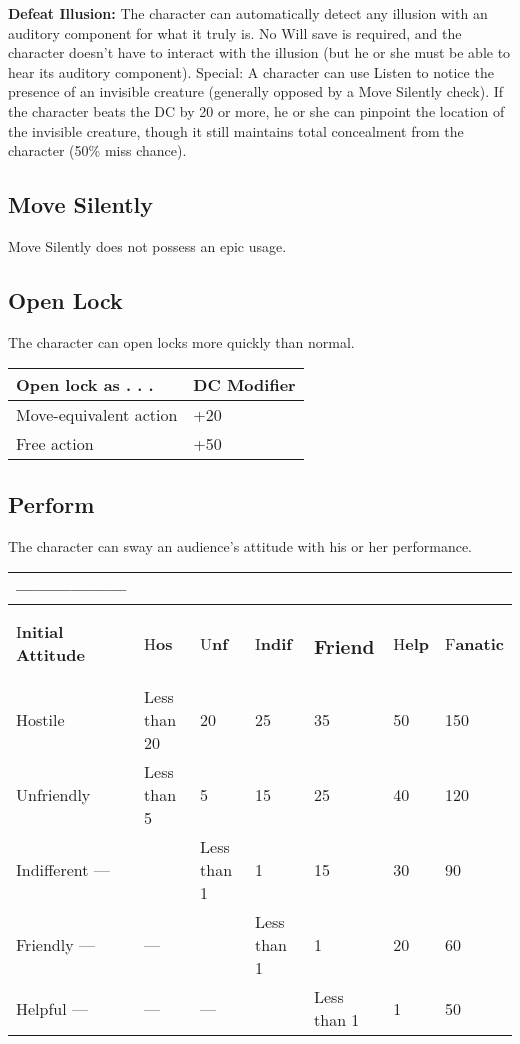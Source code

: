 \documentclass{article}
\begin{document}
\textbf{Defeat Illusion:}\textit{ }The character can automatically detect any illusion 
with an auditory component for what it truly is. No Will save is required, and 
the character doesn't have to interact with the illusion (but he or she must be 
able to hear its auditory component). Special: A character can use Listen to notice 
the presence of an invisible creature (generally opposed by a Move Silently check). 
If the character beats the DC by 20 or more, he or she can pinpoint the location 
of the invisible creature, though it still maintains total concealment from the 
character (50\% miss chance). 

\vspace{12pt}
\subsection*{Move Silently }

Move Silently does not possess an epic usage. 

\vspace{12pt}
\subsection*{Open Lock }

The character can open locks more quickly than normal. 

\begin{tabular}{|>{\raggedright}p{94pt}|>{\raggedright}p{53pt}|}
\hline
O\textbf{pen lock as . . . } & D\textbf{C Modifier }\tabularnewline
\hline
Move-equivalent action  & +20 \tabularnewline
\hline
Free action  & +50 \tabularnewline
\hline
\end{tabular}

\vspace{12pt}
\subsection*{Perform }

The character can sway an audience's attitude with his or her performance.

\begin{tabular}{|>{\raggedright}p{57pt}|>{\raggedright}p{44pt}|>{\raggedright}p{39pt}|>{\raggedright}p{39pt}|>{\raggedright}p{39pt}|>{\raggedright}p{17pt}|>{\raggedright}p{27pt}|}
\hline
 ------------------ & \multicolumn{6}{p{209pt}|}{N\textbf{ew Attitude ------------------}}\tabularnewline
\hline
I\textbf{nitial Attitude } & H\textbf{os} & U\textbf{nf} & I\textbf{ndif} & \subsubsection*{F\textbf{riend}} & H\textbf{elp} & F\textbf{anatic}\tabularnewline
\hline
Hostile  & Less than 20 & 20 & 25 & 35 & 50 & 150\tabularnewline
\hline
Unfriendly  & Less than 5 & 5 & 15 & 25 & 40 & 120\tabularnewline
\hline
Indifferent --- &  & Less than 1 & 1 & 15 & 30 & 90\tabularnewline
\hline
Friendly --- & --- &  & Less than 1 & 1 & 20 & 60\tabularnewline
\hline
Helpful --- & --- & --- &  & Less than 1 & 1 & 50\tabularnewline
\hline
\end{tabular}
\end{document}
